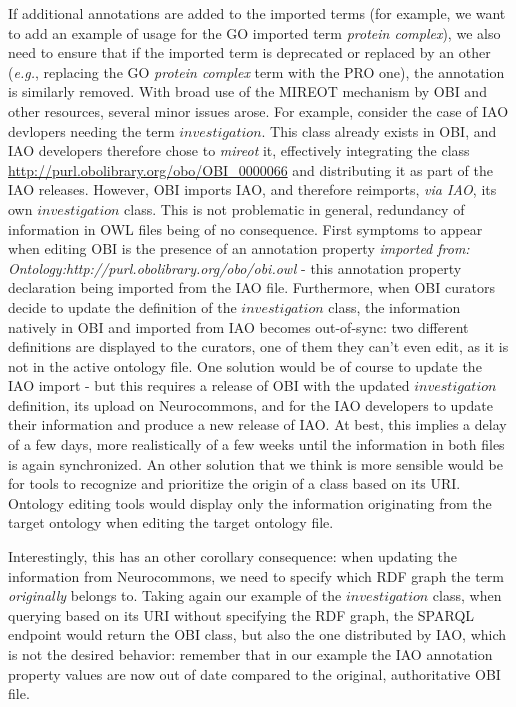 \documentclass{ao2e}%
\begin{document}
If additional annotations are added to the imported terms (for example, we want to add an example of usage for the \ac{GO} imported term \textit{protein complex}), we also need to ensure that if the imported term is deprecated or replaced by an other (\emph{e.g.}, replacing  the \ac{GO} \textit{protein complex} term with the \ac{PRO} one), the annotation is similarly removed. 
With broad use of the MIREOT mechanism by OBI and other resources, several minor issues arose.
For example, consider the case of \ac{IAO} devlopers needing the term $investigation$.  This class already exists in \ac{OBI}, and \ac{IAO} developers therefore chose to \emph{mireot} it, effectively integrating the class \url{http://purl.obolibrary.org/obo/OBI_0000066} and distributing it as part of the \ac{IAO} releases.
However, \ac{OBI} imports \ac{IAO}, and therefore reimports, \emph{via IAO}, its own $investigation$ class. This is not problematic in general, redundancy of information in OWL files being of no consequence. First symptoms to appear when editing \ac{OBI} is the presence of an annotation property \emph{imported from: Ontology:http://purl.obolibrary.org/obo/obi.owl} - this annotation property declaration being imported from the IAO file.
Furthermore, when \ac{OBI} curators decide to update the definition of the $investigation$ class, the information natively in \ac{OBI} and imported from \ac{IAO} becomes out-of-sync: two different definitions are displayed to the curators, one of them they can't even edit, as it is not in the active ontology file.
One solution would be of course to update the \ac{IAO} import - but this requires a release of \ac{OBI} with the updated $investigation$ definition, its upload on Neurocommons, and for the \ac{IAO} developers to update their information and produce a new release of \ac{IAO}. At best, this implies a delay of a few days, more realistically of a few weeks until the information in both files is again synchronized.
An other solution that we think is more sensible would be for tools to recognize and prioritize the origin of a class based on its URI. Ontology editing tools would display only the information originating from the target ontology when editing the target ontology file.

Interestingly, this has an other corollary consequence: when updating the information from Neurocommons, we need to specify which \ac{RDF} graph \cite{RDF} the term \emph{originally} belongs to. Taking again our example of the $investigation$ class, when querying based on its URI without specifying the RDF graph, the SPARQL endpoint would return the \ac{OBI} class, but also the one distributed by \ac{IAO}, which is not the desired behavior: remember that in our example the \ac{IAO} annotation property values are now out of date compared to the original, authoritative \ac{OBI} file.
\end{document}
